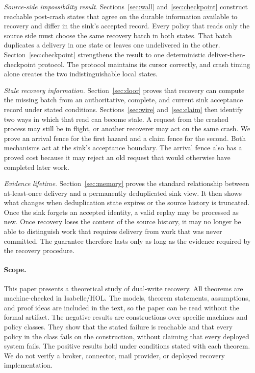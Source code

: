 \documentclass[sigplan,10pt]{acmart}
\theoremstyle{plain}
\theoremstyle{definition}
\begin{document}
\emph{Source-side impossibility result.}
Sections~\ref{sec:wall} and~\ref{sec:checkpoint} construct reachable
post-crash states that agree on the durable information available to
recovery and differ in the sink's accepted record. Every policy that
reads only the source side must choose the same recovery batch in both
states. That batch duplicates a delivery in one state or leaves one
undelivered in the other. Section~\ref{sec:checkpoint} strengthens the result
to one deterministic deliver-then-checkpoint protocol. The protocol
maintains its cursor correctly, and crash timing alone creates the two
indistinguishable local states.

\emph{Stale recovery information.}
Section~\ref{sec:door} proves that recovery can compute the missing
batch from an authoritative, complete, and current sink acceptance
record under stated conditions. Sections~\ref{sec:wire}
and~\ref{sec:claim} then identify two ways in which that read can
become stale. A request from the crashed process may still be in
flight, or another recoverer may act on the same crash. We prove an
arrival fence for the first hazard and a claim fence for the second.
Both mechanisms act at the sink's acceptance boundary. The arrival
fence also has a proved cost because it may reject an old request that
would otherwise have completed later work.

\emph{Evidence lifetime.}
Section~\ref{sec:memory} proves the standard relationship between
at-least-once delivery and a permanently deduplicated sink view. It
then shows what changes when deduplication state expires or the source
history is truncated. Once the sink forgets an accepted identity, a
valid replay may be processed as new. Once recovery loses the content
of the source history, it may no longer be able to distinguish work
that requires delivery from work that was never committed. The guarantee
therefore lasts only as long as the evidence required by the recovery
procedure.

\paragraph{Scope.}
This paper presents a theoretical study of dual-write recovery.
All theorems are machine-checked in Isabelle/HOL. The models, theorem
statements, assumptions, and proof ideas are included in the text, so
the paper can be read without the formal artifact. The negative results
are constructions over specific machines and policy classes. They show
that the stated failure is reachable and that every policy in the class
fails on the construction, without claiming that every deployed system fails.
The positive results hold under conditions stated with each theorem. We do
not verify a broker, connector, mail provider, or deployed recovery implementation.
\end{document}
